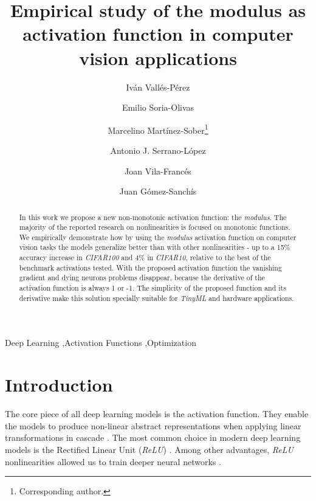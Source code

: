 \documentclass[authoryear]{elsarticle}
\begin{document}
	\begin{frontmatter}
	\title{Empirical study of the modulus as activation function in computer vision applications}
	\author[UV]{Iván Vallés-Pérez}
	\author[UV]{Emilio Soria-Olivas}

	\author[UV]{Marcelino Martínez-Sober\footnote{Corresponding author.}}%
	\author[UV]{Antonio J. Serrano-López}
	\author[UV]{Joan Vila-Francés}
	\author[UV]{Juan Gómez-Sanchís}
	
	\address[UV]{IDAL, Intelligent Data Analysis Laboratory, University of Valencia, Avenida de la Universitat s/n 46100 Burjassot, Valencia, Spain. 
	}
	
	\begin{abstract}
	In this work we propose a new non-monotonic activation function: the \textit{modulus}. The majority of the reported research on nonlinearities is focused on monotonic functions. We empirically demonstrate how by using the \textit{modulus} activation function on computer vision tasks the models generalize better than with other nonlinearities - up to a 15\% accuracy increase in \textit{CIFAR100} and 4\% in \textit{CIFAR10}, relative to the best of the benchmark activations tested. With the proposed activation function the vanishing gradient and dying neurons problems disappear, because the derivative of the activation function is always 1 or -1. The simplicity of the proposed function and its derivative make this solution specially suitable for \textit{TinyML} and hardware applications. 
	\end{abstract}
	
	\begin{keyword}
		Deep Learning \sep Activation Functions \sep Optimization
	\end{keyword}
	
\end{frontmatter}



\section{Introduction}
The core piece of all deep learning models is the activation function. They enable the models to produce non-linear abstract representations when applying linear transformations in cascade \citep{goodfellow2016}. The most common choice in modern deep learning models is the Rectified Linear Unit (\textit{ReLU}) \citep{nair2010}. Among other advantages, \textit{ReLU} nonlinearities allowed us to train deeper neural networks \citep{xu2015}.
\end{document}
